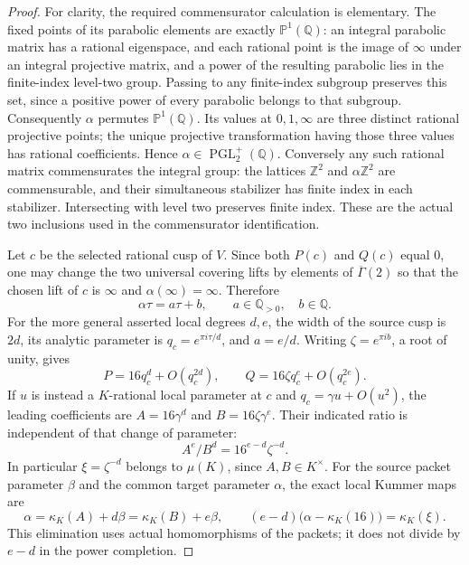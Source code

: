 \documentclass[11pt,oneside]{article}
\begin{document}
\begin{proof}
For clarity, the required commensurator calculation is elementary.
The fixed points of its parabolic elements are exactly
$\mathbb P^1(\mathbb Q)$: an integral parabolic matrix has a
rational eigenspace, and each rational point is the image
of $\infty$ under an integral projective matrix, and a power
of the resulting parabolic lies in the finite-index level-two
group. Passing to any finite-index subgroup preserves this set,
since a positive power of every parabolic belongs to that
subgroup. Consequently $\alpha$ permutes
$\mathbb P^1(\mathbb Q)$. Its values at $0,1,\infty$ are
three distinct rational projective points; the unique projective
transformation having those three values has rational
coefficients. Hence
$\alpha\in\operatorname{PGL}_2^+(\mathbb Q)$.
Conversely any such rational matrix commensurates the integral
group: the lattices $\mathbb Z^2$ and $\alpha\mathbb Z^2$
are commensurable, and their simultaneous stabilizer has finite
index in each stabilizer. Intersecting with level two preserves
finite index. These are the actual two inclusions used in
the commensurator identification.

Let $c$ be the selected rational cusp of $V$. Since both
$P(c)$ and $Q(c)$ equal $0$, one may change the two universal
covering lifts by elements of $\overline\Gamma(2)$ so that
the chosen lift of $c$ is $\infty$ and
$\alpha(\infty)=\infty$. Therefore
\[
                \alpha\tau=a\tau+b,
                 \qquad a\in\mathbb Q_{>0},\quad b\in\mathbb Q.
\]
For the more general asserted local degrees $d,e$, the width
of the source cusp is $2d$, its analytic parameter is
$q_c=e^{\pi i\tau/d}$, and $a=e/d$. Writing
$\zeta=e^{\pi i b}$, a root of unity, gives
\[
                 P=16q_c^d+O(q_c^{2d}),\qquad
                 Q=16\zeta q_c^e+O(q_c^{2e}).
 \tag{F.46.4}
\]
If $u$ is instead a $K$-rational local parameter at $c$ and
$q_c=\gamma u+O(u^2)$, the leading coefficients are
$A=16\gamma^d$ and $B=16\zeta\gamma^e$. Their indicated
ratio is independent of that change of parameter:
\[
               A^e/B^d=16^{e-d}\zeta^{-d}.
 \tag{F.46.5}
\]
In particular $\xi=\zeta^{-d}$ belongs to $\mu(K)$, since
$A,B\in K^\times$. For the source packet parameter $\beta$
and the common target parameter $\alpha$, the exact local
Kummer maps are
\[
 \alpha=\kappa_K(A)+d\beta=\kappa_K(B)+e\beta,
 \qquad
 (e-d)\bigl(\alpha-\kappa_K(16)\bigr)=\kappa_K(\xi).
 \tag{F.46.6}
\]
This elimination uses actual homomorphisms of the packets; it
does not divide by $e-d$ in the power completion.


\end{proof}
\end{document}
